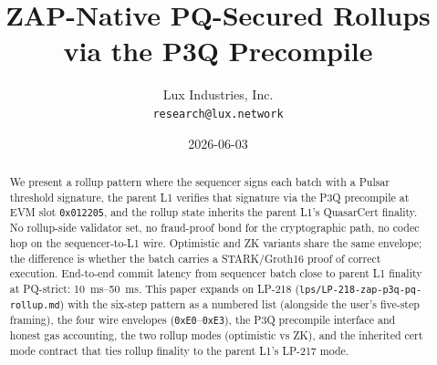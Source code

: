 \documentclass[11pt,a4paper]{article}
\title{ZAP-Native PQ-Secured Rollups\\
       via the P3Q Precompile}
\author{Lux Industries, Inc. \\
        \texttt{research@lux.network}}
\date{2026-06-03}
\begin{document}
\luxcoverpage

\begin{abstract}
We present a rollup pattern where the sequencer signs each batch
with a Pulsar threshold signature, the parent L1 verifies that
signature via the P3Q precompile at EVM slot \texttt{0x012205}, and
the rollup state inherits the parent L1's QuasarCert finality. No
rollup-side validator set, no fraud-proof bond for the
cryptographic path, no codec hop on the sequencer-to-L1 wire.
Optimistic and ZK variants share the same envelope; the difference
is whether the batch carries a STARK/Groth16 proof of correct
execution. End-to-end commit latency from sequencer batch close to
parent L1 finality at PQ-strict: \SI{10}{\milli\second}--\SI{50}{\milli\second}.
This paper expands on LP-218
(\texttt{lps/LP-218-zap-p3q-pq-rollup.md}) with the
six-step pattern as a numbered list (alongside the user's five-step
framing), the four wire envelopes
(\texttt{0xE0}--\texttt{0xE3}), the P3Q precompile interface and
honest gas accounting, the two rollup modes (optimistic vs ZK), and
the inherited cert mode contract that ties rollup finality to the
parent L1's LP-217 mode.
\end{abstract}

\tableofcontents
\newpage










\end{document}
